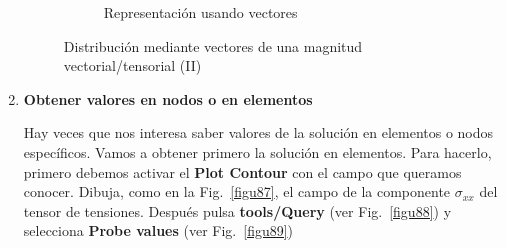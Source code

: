 \begin{enumerate}
\begin{figure}[H]
\begin{subfigure}{0.44\textwidth}
      \caption{Representación usando vectores}
      \label{figu86}
    \end{subfigure}%
    \caption{Distribución mediante vectores de una magnitud
      vectorial/tensorial (II)}
  \end{figure}

\item \textbf{Obtener valores en nodos o en elementos}

  Hay veces que nos interesa saber valores de la solución en elementos
  o nodos específicos. Vamos a obtener primero la solución en
  elementos. Para hacerlo, primero debemos activar el \textbf{Plot
    Contour} con el campo que queramos conocer. Dibuja, como en la
  Fig.~\ref{figu87}, el campo de la componente $\sigma_{xx}$ del
  tensor de tensiones.  Después pulsa \textbf{tools/Query} (ver
  Fig.~\ref{figu88}) y selecciona \textbf{Probe values} (ver
  Fig.~\ref{figu89})


\end{enumerate}
